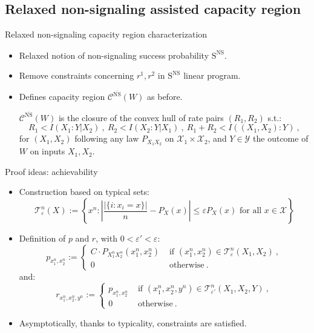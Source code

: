 \documentclass{beamer}
\theoremstyle{definition}
\theoremstyle{remark}
\begin{document}
\subsection{Relaxed non-signaling assisted capacity region}
\begin{frame}{Relaxed non-signaling capacity region characterization}
  \begin{itemize}
  \item Relaxed notion of non-signaling success probability $\mathrm{S}^{\overline{\mathrm{NS}}}$.
  \item Remove constraints concerning $r^1,r^2$ in $\mathrm{S}^{\mathrm{NS}}$ linear program.
    \pause
    \bigskip
  \item Defines capacity region $\mathcal{C}^{\overline{\mathrm{NS}}}(W)$ as before.
    \pause
    \bigskip
      \begin{theorem}
        \label{theo:CharaNSrelaxed}
        $\mathcal{C}^{\overline{\mathrm{NS}}}(W)$ is the closure of the convex hull of rate pairs $(R_1,R_2)$ s.t.:
        \[ R_1 < I(X_1:Y|X_2)\ ,\ R_2 < I(X_2:Y|X_1)\ ,\ R_1+R_2 < I((X_1,X_2):Y) \ ,\]
        for $(X_1,X_2)$ following \alert{any law $P_{X_1X_2}$ on $\mathcal{X}_1 \times \mathcal{X}_2$}, and $Y \in \mathcal{Y}$ the outcome of $W$ on inputs $X_1,X_2$.
  \end{theorem}
  \end{itemize}
\end{frame}

\begin{frame}{Proof ideas: achievability}
  \begin{itemize}
  \item Construction based on typical sets:
    \[  \mathcal{T}^n_{\varepsilon}(X) := \left\{x^n : \left|\frac{|\{i : x_i=x\}|}{n} - P_{X}(x)\right|\leq \varepsilon P_{X}(x) \text{ for all } x \in \mathcal{X}\right\}\]
    \pause
  \item Definition of $p$ and $r$, with $0 < \varepsilon' < \varepsilon$:
    \[ p_{x_1^n,x_2^n} := \begin{cases}
      C \cdot P_{X_1^nX_2^n}(x_1^n,x_2^n) & \text{ if }  (x_1^n,x_2^n) \in \mathcal{T}^n_{\varepsilon}(X_1,X_2) \ , \\
    0 & \text{ otherwise} \ .
  \end{cases}
  \]
  and:
  \[ r_{x_1^n,x_2^n,y^n} := \begin{cases}
    p_{x_1^n,x_2^n} & \text{ if } (x_1^n,x_2^n,y^n) \in \mathcal{T}^n_{\varepsilon'}(X_1,X_2,Y) \ ,\\
    0 & \text{ otherwise} \ .
  \end{cases}
    \]

        \pause
        \bigskip
  \item Asymptotically, thanks to typicality, constraints are satisfied.
  \end{itemize}
\end{frame}
\end{document}
